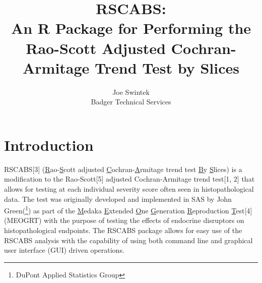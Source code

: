 \documentclass[a4paper]{article}
\begin{document}
\title{RSCABS:\\ An R Package for Performing the  Rao-Scott Adjusted Cochran-Armitage Trend Test by Slices}
\author{Joe Swintek \\ Badger Technical Services }

\maketitle
\clearpage
\tableofcontents
\clearpage


\section*{Introduction}
\label{sec:intro}
\thispagestyle{plain}

	RSCABS[3] (\underline{R}ao-\underline{S}cott adjusted \underline{C}ochran-\underline{A}rmitage trend test \underline{B}y \underline{S}lices) is a modification to the Rao-Scott[5] adjusted Cochran-Armitage trend test[1, 2] 
	that allows for testing at each individual severity score often seen in histopathological data.  The test was originally developed and implemented in SAS\texttrademark{} by John Green(\footnote{DuPont Applied Statistics Group}) as part of the 
	 \underline{M}edaka  \underline{E}xtended  \underline{O}ne  \underline{G}eneration  \underline{R}eproduction  \underline{T}est[4] (MEOGRT) with the purpose of testing the effects of endocrine disruptors on histopathological endpoints. 
	The RSCABS package allows for easy use of the RSCABS analysis with the capability of using both command line and graphical user interface (GUI) driven operations.      
\end{document}
